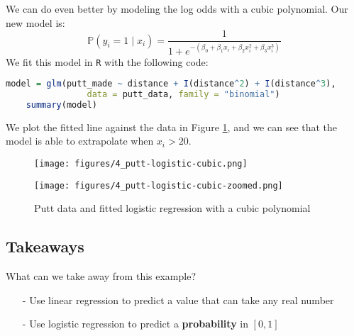\documentclass[twoside]{article}
\theoremstyle{definition}
\begin{document}
We can do even better by modeling the log odds with a cubic polynomial. Our new model is:
\begin{equation}
    \mathbb{P}(y_i = 1 \mid x_i) = \frac{1}{1 + e^{-(\beta_0 + \beta_1 x_i + \beta_2 x_i^2 + \beta_3 x_i^3)}}
\end{equation}
We fit this model in \texttt{R} with the following code:
\begin{lstlisting}[language=R]
    model = glm(putt_made ~ distance + I(distance^2) + I(distance^3),
                data = putt_data, family = "binomial")
    summary(model)
\end{lstlisting}
We plot the fitted line against the data in Figure \ref{fig:putt-logistic-cubic}, and we can see that the model is able to extrapolate when $x_i > 20$.
\begin{figure}[H]
    \centering
    \begin{minipage}{0.48\textwidth}
        \centering
        \texttt{[image: figures/4\_putt-logistic-cubic.png]}
    \end{minipage}
    \hfill
    \begin{minipage}{0.48\textwidth}
        \centering
        \texttt{[image: figures/4\_putt-logistic-cubic-zoomed.png]}
    \end{minipage}
    \caption{Putt data and fitted logistic regression with a cubic polynomial}
    \label{fig:putt-logistic-cubic}
\end{figure}

\subsection{Takeaways}

What can we take away from this example?
\begin{itemize}
    \item[-] Use linear regression to predict a value that can take any real number
    \item[-] Use logistic regression to predict a \textbf{probability} in $[0,1]$
\end{itemize}
\end{document}
